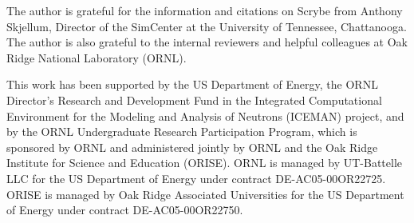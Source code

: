 
The author is grateful for the information and citations on Scrybe from Anthony
Skjellum, Director of the SimCenter at the University of Tennessee, Chattanooga.
The author is also grateful to the internal reviewers and helpful colleagues at
Oak Ridge National Laboratory (ORNL).

This work has been supported by the US Department of Energy, the ORNL Director's
Research and Development Fund in the Integrated Computational Environment for
the Modeling and Analysis of Neutrons (ICEMAN) project, and by the ORNL
Undergraduate Research Participation Program, which is sponsored by ORNL and
administered jointly by ORNL and the Oak Ridge Institute for Science and
Education (ORISE). ORNL is managed by UT-Battelle LLC for the US Department of
Energy under contract DE-AC05-00OR22725. ORISE is managed by Oak Ridge
Associated Universities for the US Department of Energy under contract
DE-AC05-00OR22750.